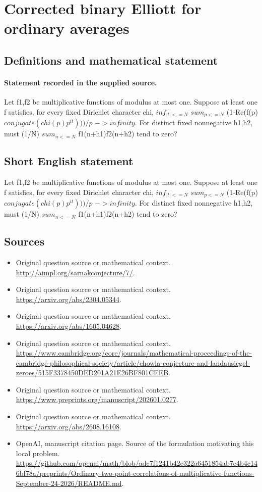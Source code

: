 \documentclass[11pt]{article}
\begin{document}
\section*{Corrected binary Elliott for ordinary averages}\label{30007256}
\subsection{Definitions and mathematical statement}
\paragraph{Statement recorded in the supplied source.}
Let f1,f2 be multiplicative functions of modulus at most one. Suppose at least one f satisfies, for every fixed Dirichlet character chi, $inf_{|t|<=N}$ $sum_{p<=N}$ (1-Re(f(p) $conjugate(chi(p)p^{it})))/p$ $->infinity$. For distinct fixed nonnegative h1,h2, must (1/N) $sum_{n<=N}$ f1(n+h1)f2(n+h2) tend to zero?
\subsection{Short English statement}
Let f1,f2 be multiplicative functions of modulus at most one. Suppose at least one f satisfies, for every fixed Dirichlet character chi, $inf_{|t|<=N}$ $sum_{p<=N}$ (1-Re(f(p) $conjugate(chi(p)p^{it})))/p$ $->infinity$. For distinct fixed nonnegative h1,h2, must (1/N) $sum_{n<=N}$ f1(n+h1)f2(n+h2) tend to zero?
\subsection{Sources}
\begin{itemize}
\item[S1] Original question source or mathematical context.
\url{http://aimpl.org/sarnakconjecture/7/}.
\item[S2] Original question source or mathematical context.
\url{https://arxiv.org/abs/2304.05344}.
\item[S3] Original question source or mathematical context.
\url{https://arxiv.org/abs/1605.04628}.
\item[S4] Original question source or mathematical context.
\url{https://www.cambridge.org/core/journals/mathematical-proceedings-of-the-cambridge-philosophical-society/article/chowla-conjecture-and-landausiegel-zeroes/515F3378450DED201A21E26BF801CEEB}.
\item[S5] Original question source or mathematical context.
\url{https://www.preprints.org/manuscript/202601.0277}.
\item[S6] Original question source or mathematical context.
\url{https://arxiv.org/abs/2608.16108}.
\item[S7] OpenAI, manuscript citation page. Source of the formulation motivating this local problem.
\url{https://github.com/openai/math/blob/adc7f1241b42e322a6451854ab7e4b4c146bf78a/preprints/Ordinary-two-point-correlations-of-multiplicative-functions-September-24-2026/README.md}.
\end{itemize}
\end{document}
